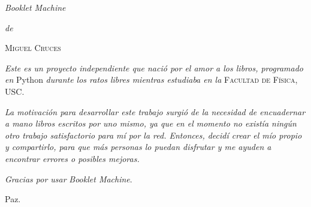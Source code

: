 \documentclass[a5paper]{article}
\begin{document}
\begin{titlepage}


\textsl{\Huge Booklet Machine}

\begin{center}
\textit{de}
\end{center}

\begin{flushright}
\textsc{\Huge Miguel Cruces}

\end{flushright}

\vfill



\textit{Este es un proyecto independiente que nació por el amor a los libros, programado en} \textsf{Python} \textit{durante los ratos libres mientras estudiaba en la} \textsc{Facultad de Física, USC}. 
 
\textit{La motivación para desarrollar este trabajo surgió de la necesidad de encuadernar a mano libros escritos por uno mismo, ya que en el momento no existía ningún otro trabajo satisfactorio para mí por la red. Entonces, decidí crear el mío propio y compartirlo, para que más personas lo puedan disfrutar y me ayuden a encontrar errores o posibles mejoras.}


\begin{flushright}
\textit{Gracias por usar} \textsl{Booklet Machine}.

Paz.

\vspace{0.25cm}
\end{flushright}


\vfill

\begin{center}
\end{center}

\vspace*{-2cm}

\end{titlepage}
\end{document}
